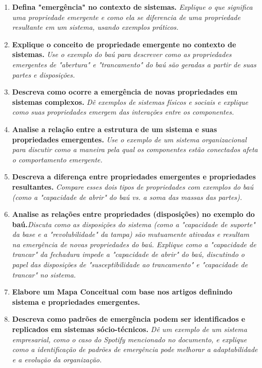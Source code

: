 \documentclass[article,a4paper]{abntex2}
\begin{document}
\begin{enumerate}
    \item \textbf{Defina "emergência" no contexto de sistemas.} \textit{Explique o que significa uma propriedade emergente e como ela se diferencia de uma propriedade resultante em um sistema, usando exemplos práticos.}
    \item \textbf{Explique o conceito de propriedade emergente no contexto de sistemas.} \textit{Use o exemplo do baú para descrever como as propriedades emergentes de "abertura" e "trancamento" do baú são geradas a partir de suas partes e disposições.}
    \item \textbf{Descreva como ocorre a emergência de novas propriedades em sistemas complexos.} \textit{Dê exemplos de sistemas físicos e sociais e explique como suas propriedades emergem das interações entre os componentes.}
    \item \textbf{Analise a relação entre a estrutura de um sistema e suas propriedades emergentes.} \textit{Use o exemplo de um sistema organizacional para discutir como a maneira pela qual os componentes estão conectados afeta o comportamento emergente.}
    \item \textbf{Descreva a diferença entre propriedades emergentes e propriedades resultantes.} \textit{Compare esses dois tipos de propriedades com exemplos do baú (como a "capacidade de abrir" do baú vs. a soma das massas das partes).}
    \item \textbf{Analise as relações entre propriedades (disposições) no exemplo do baú.}\textit{Discuta como as disposições do sistema (como a "capacidade de suporte" da base e a "revolubilidade" da tampa) são mutuamente ativadas e resultam na emergência de novas propriedades do baú. Explique como a "capacidade de trancar" da fechadura impede a "capacidade de abrir" do baú, discutindo o papel das disposições de "susceptibilidade ao trancamento" e "capacidade de trancar" no sistema.}
    \item \textbf{Elabore um Mapa Conceitual com base nos artigos definindo sistema e propriedades emergentes.}
    \item \textbf{Descreva como padrões de emergência podem ser identificados e replicados em sistemas sócio-técnicos.} \textit{Dê um exemplo de um sistema empresarial, como o caso do Spotify mencionado no documento, e explique como a identificação de padrões de emergência pode melhorar a adaptabilidade e a evolução da organização.}
\end{enumerate}\vspace{0.5cm}
\end{document}
